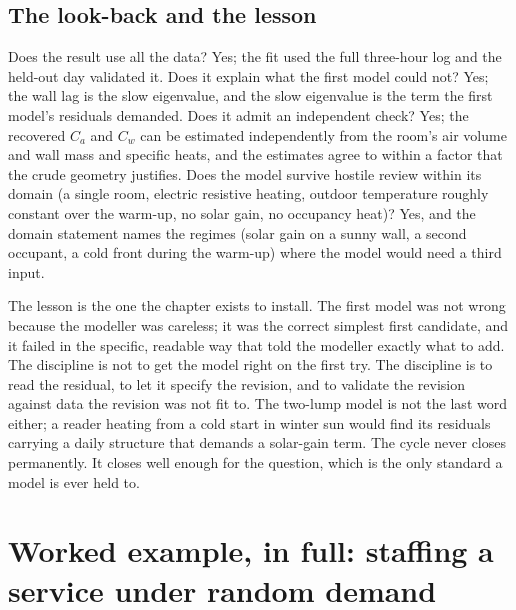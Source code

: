 \subsection{The look-back and the lesson}

Does the result use all the data? Yes; the fit used the full three-hour
log and the held-out day validated it. Does it explain what the first
model could not? Yes; the wall lag is the slow eigenvalue, and the slow
eigenvalue is the term the first model's residuals demanded. Does it
admit an independent check? Yes; the recovered $C_a$ and $C_w$ can be
estimated independently from the room's air volume and wall mass and
specific heats, and the estimates agree to within a factor that the
crude geometry justifies. Does the model survive hostile review within
its domain (a single room, electric resistive heating, outdoor
temperature roughly constant over the warm-up, no solar gain, no
occupancy heat)? Yes, and the domain statement names the regimes (solar
gain on a sunny wall, a second occupant, a cold front during the warm-up)
where the model would need a third input.

The lesson is the one the chapter exists to install. The first model was
not wrong because the modeller was careless; it was the correct simplest
first candidate, and it failed in the specific, readable way that told
the modeller exactly what to add. The discipline is not to get the model
right on the first try. The discipline is to read the residual, to let it
specify the revision, and to validate the revision against data the
revision was not fit to. The two-lump model is not the last word either;
a reader heating from a cold start in winter sun would find its
residuals carrying a daily structure that demands a solar-gain term. The
cycle never closes permanently. It closes well enough for the question,
which is the only standard a model is ever held to.

\section{Worked example, in full: staffing a service under random demand}

